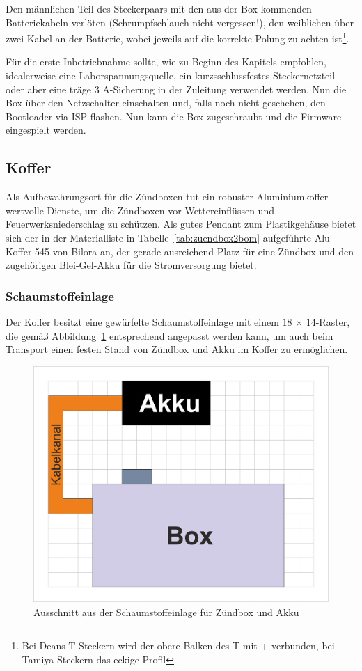 \documentclass[paper=a4, parskip, numbers=noenddot, toc=listof, headsepline]{scrbook}
\begin{document}
					Den männlichen Teil des Steckerpaars mit den aus der Box kommenden Batteriekabeln verlöten (Schrumpfschlauch nicht vergessen!), den weiblichen über zwei Kabel an der Batterie, wobei jeweils auf die korrekte Polung zu achten ist\footnote{Bei Deans-T-Steckern wird der obere Balken des T mit + verbunden, bei Tamiya-Steckern das eckige Profil}.

					Für die erste Inbetriebnahme sollte, wie zu Beginn des Kapitels empfohlen, idealerweise eine Laborspannungsquelle, ein kurzsschlussfestes Steckernetzteil oder aber eine träge 3 A-Sicherung in der Zuleitung verwendet werden. Nun die Box über den Netzschalter einschalten und, falls noch nicht geschehen, den Bootloader via ISP flashen. Nun kann die Box zugeschraubt und die
					Firmware eingespielt werden.

				\subsection{Koffer}

					Als Aufbewahrungsort für die Zündboxen tut ein robuster Aluminiumkoffer wertvolle Dienste, um die Zündboxen vor Wettereinflüssen und Feuerwerks\-nieder\-schlag zu schützen. Als gutes Pendant zum Plastikgehäuse bietet sich der in der Materialliste in Tabelle~\ref{tab:zuendbox2bom} aufgeführte Alu-Koffer 545 von Bilora an, der gerade ausreichend Platz für eine Zündbox und den zugehörigen Blei-Gel-Akku für die Stromversorgung bietet.

					\subsubsection{Schaumstoffeinlage}

						Der Koffer besitzt eine gewürfelte Schaumstoffeinlage mit einem $18\,\times\,14$-Raster, die gemäß Abbildung~\ref{fig:foamcut} entsprechend angepasst werden kann, um auch beim Transport einen festen Stand von Zündbox und Akku im Koffer zu ermöglichen.

						\begin{figure}
							\centering
							\includegraphics[width=.7\textwidth]{Bilder/foamcut.png}
							\caption{Ausschnitt aus der Schaumstoffeinlage für Zündbox und Akku}
							\label{fig:foamcut}
						\end{figure}
\end{document}
